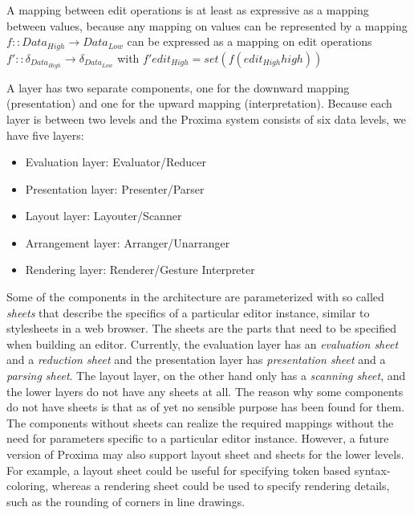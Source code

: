 A mapping between edit operations is at least as expressive as a mapping between values, because any 
mapping on values can be represented by a mapping 
$f :: Data_{High} \rightarrow Data_{Low}$ can be expressed as a mapping on edit operations
$f' ::  \delta_{Data_{High}} \rightarrow \delta_{Data_{Low}}$ with $f' edit_{High} = set (f (edit_{High}high))$
\ec

A layer has two separate components, one for the downward mapping (presentation) and one for the upward mapping (interpretation). Because each layer is between two levels and the Proxima system consists of six data levels, we have five layers:

\begin{itemize}
\item Evaluation layer: Evaluator/Reducer 
\item Presentation layer: Presenter/Parser
\item Layout layer: Layouter/Scanner
\item Arrangement layer: Arranger/Unarranger
\item Rendering layer: Renderer/Gesture Interpreter
\end{itemize}

Some of the components in the architecture are parameterized with so called {\em sheets} that describe the specifics of a particular editor instance, similar to stylesheets in a web browser. The sheets are the parts that need to be specified when building an editor. Currently, the evaluation layer has an {\em evaluation sheet} and a {\em reduction sheet} and the presentation layer has {\em presentation sheet} and a {\em parsing sheet}.  The layout layer, on the other hand only has a {\em scanning sheet}, and the lower layers do not have any sheets at all. The reason why some components do not have sheets is that as of yet no sensible purpose has been found for them. The components without sheets can realize the required mappings without the need for parameters specific to a particular editor instance. However, a future version of Proxima may also support layout sheet and sheets for the lower levels. For example, a layout sheet could be useful for specifying token based syntax-coloring, whereas a rendering sheet could be used to specify rendering details, such as the rounding of corners in line drawings.

